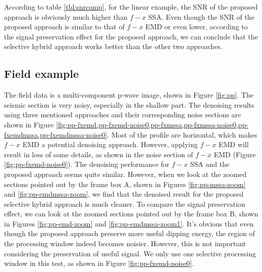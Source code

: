According to table \ref{tbl:snrcomp}, for the linear example, the SNR of the proposed approach is obviously much higher than $f-x$ SSA. Even though the SNR of the proposed approach is similar to that of $f-x$ EMD or even lower, according to the signal preservation effect for the proposed approach, we can conclude that the selective hybrid approach works better than the other two approaches.

\subsection{Field example}
The field data is a multi-component p-wave image, shown in Figure \ref{fig:pp}. The seismic section is very noisy, especially in the shallow part.%
The denoising results using three mentioned approaches and their corresponding noise sections are shown in Figure \ref{fig:pp-fxemd,pp-fxemd-noise0,pp-fxmssa,pp-fxmssa-noise0,pp-fxemdmssa,pp-fxemdmssa-noise0}. 
Most of the profile are horizontal, which makes $f-x$ EMD a potential denoising approach. However, applying $f-x$ EMD will result in loss of some details, as shown in the noise section of $f-x$ EMD (Figure \ref{fig:pp-fxemd-noise0}). The denoising performance for $f-x$ SSA and the proposed approach seems quite similar. However, when we look at the zoomed sections pointed out by the frame box A, shown in Figures \ref{fig:pp-mssa-zoom} and \ref{fig:pp-emdmssa-zoom}, we find that the denoised result for the proposed selective hybrid approach is much cleaner. To compare the signal preservation effect, we can look at the zoomed sections pointed out by the frame box B, shown in Figures \ref{fig:pp-emd-zoom} and \ref{fig:pp-emdmssa-zoom1}. It's obvious that even though the proposed approach preserve more useful dipping energy, the region of the processing window indeed becomes noisier. However, this is not important considering the preservation of useful signal. We only use one selective processing window in this test, as shown in Figure \ref{fig:pp-fxemd-noise0}.





